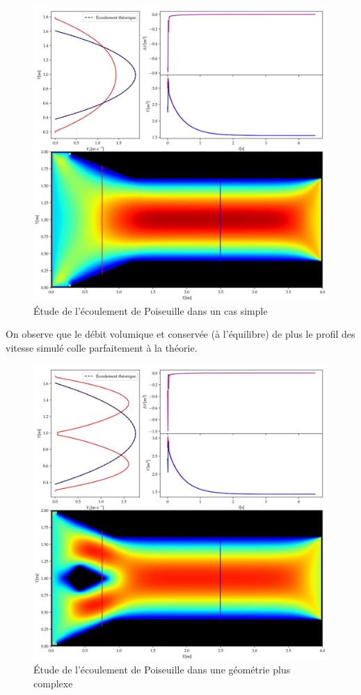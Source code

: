 \begin{figure}[hbtp]
  \centering
  \includegraphics[width=\linewidth]{Fig/Poiseuille.png}
  \caption{Étude de l'écoulement de Poiseuille dans un cas simple}
  \label{fig:P1}
\end{figure}
On observe que le débit volumique et conservée (à l'équilibre) de plus le profil des vitesse simulé colle parfaitement 
à la théorie. 
\begin{figure}[hbtp]
  \centering
  \includegraphics[width=\linewidth]{Fig/Poiseuille2.png}
  \caption{Étude de l'écoulement de Poiseuille dans une géométrie plus complexe}
  \label{fig:P2}
\end{figure}

